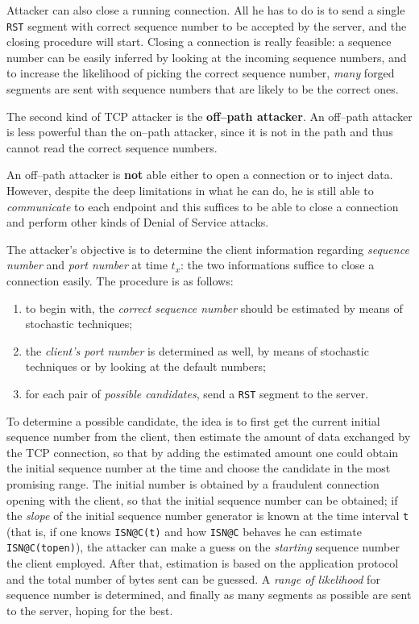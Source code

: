 \documentclass[10pt]{\classname}
\begin{document}
Attacker can also close a running connection. All he has to do is to send a
single \texttt{RST} segment with correct sequence number to be accepted by the
server, and the closing procedure will start. Closing a connection is really
feasible: a sequence number can be easily inferred by looking at the incoming
sequence numbers, and to increase the likelihood of picking the correct
sequence number, \emph{many} forged segments are sent with sequence numbers
that are likely to be the correct ones.

The second kind of TCP attacker is the \textbf{off--path attacker}. An
off--path attacker is less powerful than the on--path attacker, since it is not
in the path and thus cannot read the correct sequence numbers.

An off--path attacker is \textbf{not} able either to open a connection or to
inject data. However, despite the deep limitations in what he can do, he is
still able to \emph{communicate} to each endpoint and this suffices to be able
to close a connection and perform other kinds of Denial of Service attacks.

The attacker's objective is to determine the client information regarding \emph{sequence number} and \emph{port number} at time $t_x$: the two informations suffice to close a connection easily. The procedure is as follows:
\begin{enumerate}
    \item to begin with, the \emph{correct sequence number} should be estimated by
        means of stochastic techniques;
    \item the \emph{client's port number} is determined as well, by means of
        stochastic techniques or by looking at the default numbers;
    \item for each pair of \emph{possible candidates}, send a \texttt{RST} segment to
        the server.
\end{enumerate}

To determine a possible candidate, the idea is to first get the current initial
sequence number from the client, then estimate the amount of data exchanged by
the TCP connection, so that by adding the estimated amount one could obtain the
initial sequence number at the time and choose the candidate in the most promising range.
The initial number is obtained by a fraudulent connection opening with the
client, so that the initial sequence number can be obtained; if the
\emph{slope} of the initial sequence number generator is known at the time
interval \texttt{t} (that is, if one knows \texttt{ISN@C(t)} and how \texttt{ISN@C}
behaves he can estimate \texttt{ISN@C(topen)}), the attacker can make a guess
on the \emph{starting} sequence number the client employed. After that,
estimation is based on the application protocol and the total number of bytes
sent can be guessed. A \emph{range of likelihood} for sequence number is
determined, and finally as many segments as possible are sent to the server,
hoping for the best.
\end{document}
